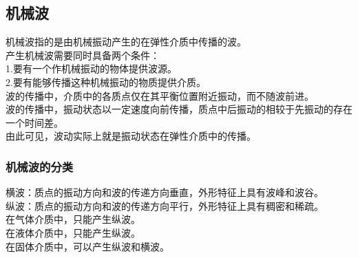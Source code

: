 \documentclass[UTF8]{ctexart}
\begin{document}
\newpage

\subsection{机械波}
    机械波指的是由机械振动产生的在弹性介质中传播的波。\\[3mm]
    产生机械波需要同时具备两个条件：\\[3mm]
    1.要有一个作机械振动的物体提供波源。\\[3mm]
    2.要有能够传播这种机械振动的物质提供介质。\\[5mm]
    波的传播中，介质中的各质点仅在其平衡位置附近振动，而不随波前进。\\[3mm]
    波的传播中，振动状态以一定速度向前传播，质点中后振动的相较于先振动的存在一个时间差。\\[3mm]
    由此可见，波动实际上就是振动状态在弹性介质中的传播。

\subsubsection{机械波的分类}
    横波：质点的振动方向和波的传递方向垂直，外形特征上具有波峰和波谷。\\[3mm]
    纵波：质点的振动方向和波的传递方向平行，外形特征上具有稠密和稀疏。\\[3mm]
    在气体介质中，只能产生纵波。\\[3mm]
    在液体介质中，只能产生纵波。\\[3mm]
    在固体介质中，可以产生纵波和横波。
\end{document}
